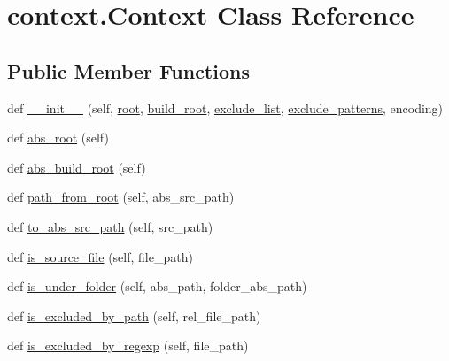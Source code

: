\hypertarget{classcontext_1_1Context}{}\section{context.\+Context Class Reference}
\label{classcontext_1_1Context}
\subsection*{Public Member Functions}
\begin{DoxyCompactItemize}
\item 
def \mbox{\hyperlink{classcontext_1_1Context_a14509da5ce3ace35fd113fabf28ee7ec}{\+\_\+\+\_\+init\+\_\+\+\_\+}} (self, \mbox{\hyperlink{classcontext_1_1Context_aab200346bb18e64591c19f34391aacb9}{root}}, \mbox{\hyperlink{classcontext_1_1Context_a2887eacce1816189225825e86b36acf6}{build\+\_\+root}}, \mbox{\hyperlink{classcontext_1_1Context_afae62ed81a382a6452043d72bdef7fb9}{exclude\+\_\+list}}, \mbox{\hyperlink{classcontext_1_1Context_aadc03f67f2b39d9287bce938e4ba773b}{exclude\+\_\+patterns}}, encoding)
\item 
def \mbox{\hyperlink{classcontext_1_1Context_ad4b88c518bc439aeb21a83d6ee4ca526}{abs\+\_\+root}} (self)
\item 
def \mbox{\hyperlink{classcontext_1_1Context_a2f92bdbfdc008e134aa1a851d603b711}{abs\+\_\+build\+\_\+root}} (self)
\item 
def \mbox{\hyperlink{classcontext_1_1Context_a91999f15aeea96f89525fead933f850b}{path\+\_\+from\+\_\+root}} (self, abs\+\_\+src\+\_\+path)
\item 
def \mbox{\hyperlink{classcontext_1_1Context_ab9d2e7e8982f8c0a02121e3b42f7b8c0}{to\+\_\+abs\+\_\+src\+\_\+path}} (self, src\+\_\+path)
\item 
def \mbox{\hyperlink{classcontext_1_1Context_ae711cf3ff8f5fc3bf67fc548ca76648b}{is\+\_\+source\+\_\+file}} (self, file\+\_\+path)
\item 
def \mbox{\hyperlink{classcontext_1_1Context_a79016c424bb82d2a64525f917aa1007b}{is\+\_\+under\+\_\+folder}} (self, abs\+\_\+path, folder\+\_\+abs\+\_\+path)
\item 
def \mbox{\hyperlink{classcontext_1_1Context_ac3e77d69e94fd565fbbc23c1a0d7a987}{is\+\_\+excluded\+\_\+by\+\_\+path}} (self, rel\+\_\+file\+\_\+path)
\item 
def \mbox{\hyperlink{classcontext_1_1Context_acd6968caa52b0a22ede9a0807f721ed0}{is\+\_\+excluded\+\_\+by\+\_\+regexp}} (self, file\+\_\+path)
\item 

\end{DoxyCompactItemize}
